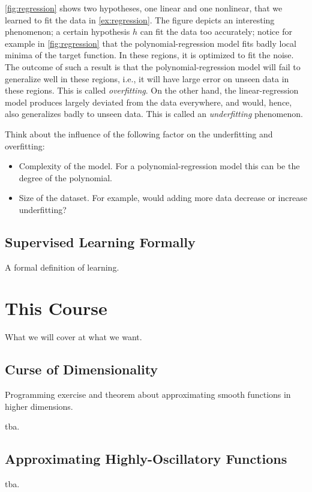 \autoref{fig:regression} shows two hypotheses, one linear and one nonlinear, that we learned to fit the data in
\autoref{ex:regression}. The figure depicts an interesting phenomenon; a certain
hypothesis $h$ can fit the data too accurately; notice for example in
\autoref{fig:regression} that the polynomial-regression model fits badly local
minima of the target function. In these regions, it is optimized to fit the
noise. The outcome of such a result is that the polynomial-regression model will
fail to generalize well in these regions, i.e., it will have large error on
unseen data in these regions. This is called \emph{overfitting}.
On the other hand, the linear-regression model produces largely deviated from
the data everywhere, and would, hence, also generalizes badly to unseen data.
This is called an \emph{underfitting} phenomenon. 

Think about the influence of the following factor on the underfitting and
overfitting:
\begin{itemize}
    \item Complexity of the model. For a polynomial-regression model this can be
    the degree of the polynomial. 
    \item Size of the dataset. For example, would adding more data decrease or
    increase underfitting?
\end{itemize}

\subsection{Supervised Learning Formally}
A formal definition of learning.

\section{This Course}
What we will cover at what we want. 
\subsection{Curse of Dimensionality}
Programming exercise and theorem about approximating smooth functions in higher
dimensions. 
\begin{boxedexample}[Classification] \complementary{\theexample}
    \label{ex:CoD}
tba.
\end{boxedexample}

\subsection{Approximating Highly-Oscillatory Functions}
\begin{boxedexample}[Classification] \complementary{\theexample}
    \label{ex:oscillatory}
    tba.
\end{boxedexample}

